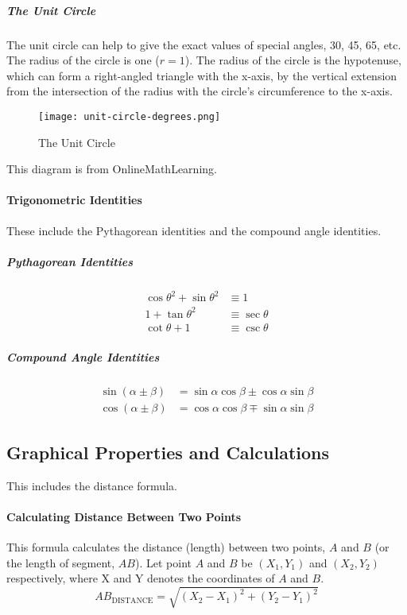 \documentclass{article}
\begin{document}
            \subparagraph{The Unit Circle}\label{UC:1} The unit circle can help to give the exact values of special angles, 30\degree, 45\degree, 65\degree, etc. The radius of the circle is one ($r=1$). The radius of the circle is the hypotenuse, which can form a right-angled triangle with the x-axis, by the vertical extension from the intersection of the radius with the circle's circumference to the x-axis.
            \begin{figure}[h!]
             \texttt{[image: unit-circle-degrees.png]}
                \caption{The Unit Circle}
                \label{fig:uc1}
            \end{figure}\newpage
            This diagram is from OnlineMathLearning\autocite{UNIT_CIRCLE:1}.
        \paragraph{Trigonometric Identities} These include the Pythagorean identities and the compound angle identities.
            \subparagraph{Pythagorean Identities}
            \begin{align}
                \cos{\theta}^2 + \sin{\theta}^2 &\equiv 1 \\
                1 + \tan{\theta}^2 &\equiv \sec{\theta} \\
                \cot{\theta} + 1 &\equiv \csc{\theta}
            \end{align}
            \subparagraph{Compound Angle Identities}
            \begin{align}
                \sin{(\alpha \pm \beta)} &= \sin{\alpha}\cos{\beta} \pm \cos{\alpha}\sin{\beta} \\
                \cos{(\alpha \pm \beta)} &= \cos{\alpha}\cos{\beta} \mp \sin{\alpha}\sin{\beta}
            \end{align}
            \newpage
        \subsection{Graphical Properties and Calculations} This includes the distance formula.
        \paragraph{Calculating Distance Between Two Points} This formula calculates the distance (length) between two points, $A$ and $B$ (or the length of segment, $AB$). Let point $A$ and $B$ be $(X_1, Y_1)$ and $(X_2, Y_2)$ respectively, where X and Y denotes the coordinates of $A$ and $B$.
        \begin{equation}
            AB_{\mathrm{DISTANCE}} = \sqrt{(X_2 - X_1)^2 + (Y_2 - Y_1)^2}
        \end{equation}
        
\end{document}
